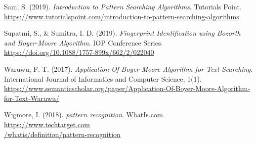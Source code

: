 \begin{thebibliography}{20}
    Sam, S. (2019). \emph{Introduction to Pattern Searching Algorithms}. Tutorials Point.
    \href{https://www.tutorialspoint.com/introduction-to-pattern-searching-algorithms#:~:text=Pattern\%20Searching\%20algorithms\%20are\%20used,task\%20for\%20a\%20longer\%20text}{https://www.tutorialspoint.com/introduction-to-pattern-searching-algorithms}

    Supatmi, S., \& Sumitra, I. D. (2019). \emph{Fingerprint Identification using Bozorth and
    Boyer-Moore Algorithm}. IOP Conference Series.
    \href{https://doi.org/10.1088/1757-899x/662/2/022040}{https://doi.org/10.1088/1757-899x/662/2/022040}

    Waruwu, F. T. (2017). \emph{Application Of Boyer Moore Algorithm for Text Searching}.
    International Journal of Informatics and Computer Science, 1(1).
    \href{https://www.semanticscholar.org/paper/Application-Of-Boyer-Moore-Algorithm-for-Text-Waruwu/423dcabcd3c5a5e5187f33726114d98e51c14a5c}{https://www.semanticscholar.org/paper/Application-Of-Boyer-Moore-Algorithm-for-Text-Waruwu/}

    Wigmore, I. (2018). \emph{pattern recognition}. WhatIs.com.
    \href{https://www.techtarget.com/whatis/definition/pattern-recognition}{https://www.techtarget.com\\/whatis/definition/pattern-recognition}

\end{thebibliography}
